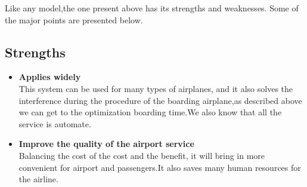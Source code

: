 Like any model,the one present above has its strengths and
weaknesses. Some of the major points are presented below.

\subsection{Strengths}
\begin{itemize}
\item \textbf{Applies widely}\\
This  system can be used for many types of airplanes, and it also
solves the interference during  the procedure of the boarding
airplane,as described above we can get to the  optimization
boarding time.We also know that all the service is automate.
\item \textbf{Improve the quality of the airport service}\\
Balancing the cost of the cost and the benefit, it will bring in
more convenient  for airport and passengers.It also saves many
human resources for the airline. 
\end{itemize}
